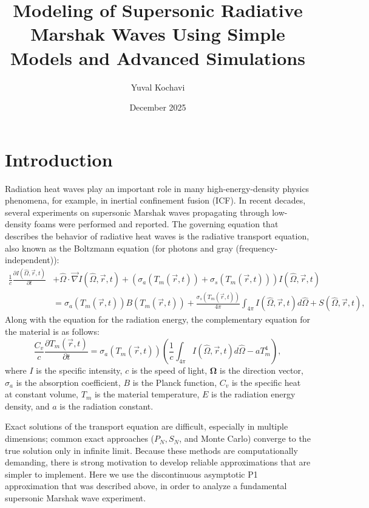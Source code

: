 \documentclass{article}
\title{Modeling of Supersonic Radiative Marshak Waves Using Simple Models and Advanced Simulations}
\author{Yuval Kochavi}
\date{December 2025}
\begin{document}
\maketitle

\section{Introduction}
Radiation heat waves play an important role in many high-energy-density
physics phenomena, for example, in inertial confinement fusion (ICF). In recent decades, several experiments on supersonic Marshak waves propagating through low-density foams were performed and reported. The governing equation that describes the behavior of radiative heat waves is the radiative transport equation, also known as the Boltzmann equation (for photons and gray (frequency-independent)):
\begin{equation}
\begin{split}
\frac{1}{c}\frac{\partial I(\hat{\Omega}, \vec{r}, t)}{\partial t} &+ \hat{\Omega} \cdot \vec{\nabla}I(\hat{\Omega}, \vec{r}, t) + \left(\sigma_a\left(T_m(\vec{r}, t)\right) + \sigma_s\left(T_m(\vec{r}, t)\right)\right)I(\hat{\Omega}, \vec{r}, t) \\
&= \sigma_a\left(T_m(\vec{r}, t)\right)B\left(T_m(\vec{r}, t)\right) + \frac{\sigma_s\left(T_m(\vec{r}, t)\right)}{4\pi}\int_{4\pi}I(\hat{\Omega}, \vec{r}, t)d\hat{\Omega} + S(\hat{\Omega}, \vec{r}, t),
\end{split}
\end{equation}
Along with the equation for the radiation energy, the complementary equation for the material is as follows:
\begin{equation}
\frac{C_v}{c} \frac{\partial T_m(\vec{r},t)}{\partial t} = \sigma_a(T_m(\vec{r},t)) \left( \frac{1}{c}\int_{4\pi} I(\hat{\Omega}, \vec{r}, t) d\hat{\Omega} - a T_m^4 \right),
\end{equation}
where \(I\) is the specific intensity, \(c\) is the speed of light, \(\mathbf{\Omega}\) is the direction vector, \(\sigma_a\) is the absorption coefficient, \(B\) is the Planck function, \(C_v\) is the specific heat at constant volume, \(T_m\) is the material temperature, \(E\) is the radiation energy density, and \(a\) is the radiation constant.

Exact solutions of the transport equation are difficult, especially in multiple dimensions; common exact approaches ($P_N, S_N$, and Monte Carlo) converge to the true solution only in infinite limit. Because these methods are computationally demanding, there is strong motivation to develop reliable approximations that are simpler to implement. Here we use the discontinuous asymptotic P1 approximation that was described above, in order to analyze a fundamental supersonic Marshak wave experiment. 
\end{document}
